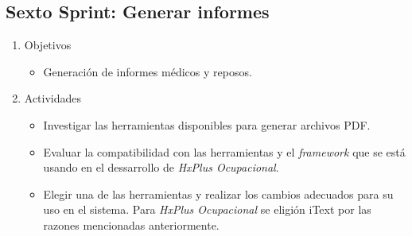     \subsection{Sexto Sprint: Generar informes}
    \begin{enumerate}
        \item Objetivos
        \begin{itemize}
            \item Generación de informes médicos y reposos.
        \end{itemize}
        \item Actividades
        \begin{itemize}
            \item Investigar las herramientas disponibles para generar archivos PDF.
            \item Evaluar la compatibilidad con las herramientas y el \textit{framework} que se está usando en el dessarrollo de \textit{HxPlus Ocupacional}.
            \item Elegir una de las herramientas y realizar los cambios adecuados para su uso en el sistema. Para \textit{HxPlus Ocupacional} se eligión iText por las razones mencionadas anteriormente.
        \end{itemize}
    \end{enumerate}
        
